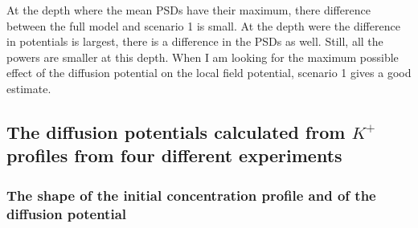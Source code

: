 \documentclass{article}
\begin{document}
At the depth where the mean PSDs have their maximum, there difference between the full model and scenario 1 is small. At the depth were the difference in potentials is largest, there is a difference in the PSDs as well. Still, all the powers are smaller at this depth. When I am looking for the maximum possible effect of the diffusion potential on the local field potential, scenario 1 gives a good estimate. 
\subsection{The diffusion potentials calculated from $K^+$ profiles from four different experiments}\label{diffusion potentials}
\subsubsection{The shape of the initial concentration profile and of the diffusion potential}\label{c(x,t) and phi(x,t)}
\end{document}
